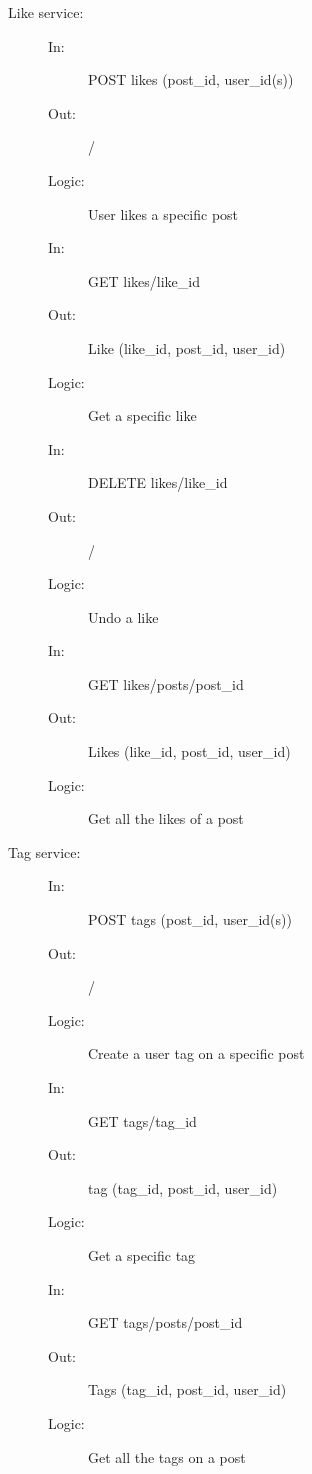 \documentclass{article}
\begin{document}
\begin{description}
    \item [Like service:] 
    \begin{description}
        \item[]
        \item[In:] POST likes (post\_id, user\_id(s))
        \item[Out:] /
        \item[Logic:] User likes a specific post
        \item[]
        
        \item[In:] GET likes/like\_id
        \item[Out:] Like (like\_id, post\_id, user\_id)
        \item[Logic:] Get a specific like
        \item[]

        \item[In:] DELETE likes/like\_id
        \item[Out:] /
        \item[Logic:] Undo a like
        \item[]

        \item[In:] GET likes/posts/post\_id
        \item[Out:] Likes (like\_id, post\_id, user\_id)
        \item[Logic:] Get all the likes of a post
    \end{description}
\end{description}

\begin{description}
    \item [Tag service:] 
    \begin{description}
        \item[]
        \item[In:] POST tags (post\_id, user\_id(s))
        \item[Out:] /
        \item[Logic:] Create a user tag on a specific post
        \item[]
        
        \item[In:] GET tags/tag\_id
        \item[Out:] tag (tag\_id, post\_id, user\_id)
        \item[Logic:] Get a specific tag
        \item[]

        \item[In:] GET tags/posts/post\_id
        \item[Out:] Tags (tag\_id, post\_id, user\_id)
        \item[Logic:] Get all the tags on a post
        \item[]
    \end{description}
\end{description}
\end{document}
